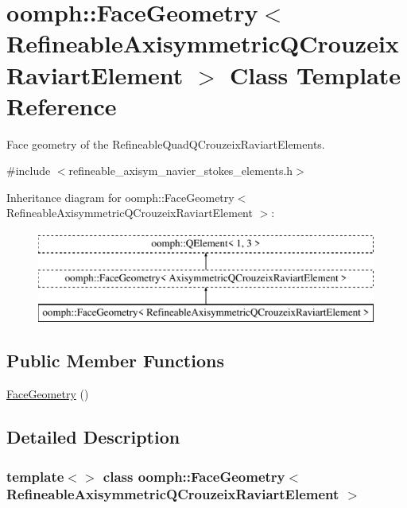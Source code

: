 \hypertarget{classoomph_1_1FaceGeometry_3_01RefineableAxisymmetricQCrouzeixRaviartElement_01_4}{}\section{oomph\+:\+:Face\+Geometry$<$ Refineable\+Axisymmetric\+Q\+Crouzeix\+Raviart\+Element $>$ Class Template Reference}
\label{classoomph_1_1FaceGeometry_3_01RefineableAxisymmetricQCrouzeixRaviartElement_01_4}


Face geometry of the Refineable\+Quad\+Q\+Crouzeix\+Raviart\+Elements.  




{\ttfamily \#include $<$refineable\+\_\+axisym\+\_\+navier\+\_\+stokes\+\_\+elements.\+h$>$}

Inheritance diagram for oomph\+:\+:Face\+Geometry$<$ Refineable\+Axisymmetric\+Q\+Crouzeix\+Raviart\+Element $>$\+:\begin{figure}[H]
\begin{center}
\leavevmode
\includegraphics[height=3.000000cm]{classoomph_1_1FaceGeometry_3_01RefineableAxisymmetricQCrouzeixRaviartElement_01_4}
\end{center}
\end{figure}
\subsection*{Public Member Functions}
\begin{DoxyCompactItemize}
\item 
\hyperlink{classoomph_1_1FaceGeometry_3_01RefineableAxisymmetricQCrouzeixRaviartElement_01_4_ac070e211c529533c6b97a67fbdedf49f}{Face\+Geometry} ()
\end{DoxyCompactItemize}


\subsection{Detailed Description}
\subsubsection*{template$<$$>$\newline
class oomph\+::\+Face\+Geometry$<$ Refineable\+Axisymmetric\+Q\+Crouzeix\+Raviart\+Element $>$}

